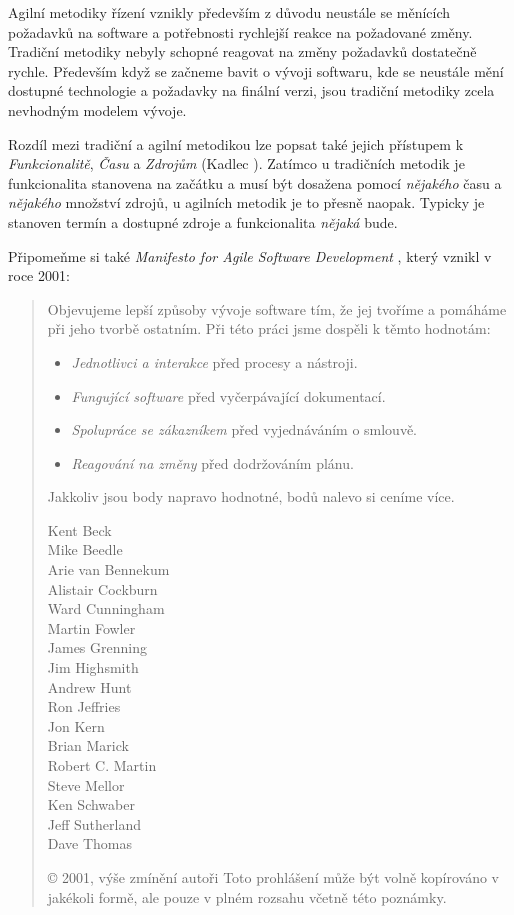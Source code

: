 Agilní metodiky řízení vznikly především z důvodu neustále se měnících požadavků na software a potřebnosti rychlejší reakce na požadované změny. Tradiční metodiky nebyly schopné reagovat na změny požadavků dostatečně rychle. Především když se začneme bavit o vývoji softwaru, kde se neustále mění dostupné technologie a požadavky na finální verzi, jsou tradiční metodiky zcela nevhodným modelem vývoje.

Rozdíl mezi tradiční a agilní metodikou lze popsat také jejich přístupem k \emph{Funkcionalitě}, \emph{Času} a \emph{Zdrojům} (Kadlec \cite{kadlec}). Zatímco u tradičních metodik je funkcionalita stanovena na začátku a musí být dosažena pomocí \emph{nějakého} času a \emph{nějakého} množství zdrojů, u agilních metodik je to přesně naopak. Typicky je stanoven termín a dostupné zdroje a funkcionalita \emph{nějaká} bude.

Připomeňme si také \emph{Manifesto for Agile Software Development} \cite{manifesto}, který vznikl v roce 2001:

\begin{quote}
Objevujeme lepší způsoby vývoje software tím,
že jej tvoříme a pomáháme při jeho tvorbě ostatním.
Při této práci jsme dospěli k těmto hodnotám:
\begin{itemize}
	\item \emph{Jednotlivci a interakce} před procesy a nástroji.
	\item \emph{Fungující software} před vyčerpávající dokumentací.
	\item \emph{Spolupráce se zákazníkem} před vyjednáváním o smlouvě.
	\item \emph{Reagování na změny} před dodržováním plánu.
\end{itemize}
Jakkoliv jsou body napravo hodnotné,
bodů nalevo si ceníme více.

\begin{multicols}{3}
Kent Beck\\
Mike Beedle\\
Arie van Bennekum\\
Alistair Cockburn\\
Ward Cunningham\\
Martin Fowler\\
James Grenning\\
Jim Highsmith\\
Andrew Hunt\\
Ron Jeffries\\
Jon Kern\\
Brian Marick\\
Robert C. Martin\\
Steve Mellor\\
Ken Schwaber\\
Jeff Sutherland\\
Dave Thomas\\
\end{multicols}

{\color{gray}
© 2001, výše zmínění autoři
Toto prohlášení může být volně kopírováno v jakékoli formě,
ale pouze v plném rozsahu včetně této poznámky.
}

\end{quote}

